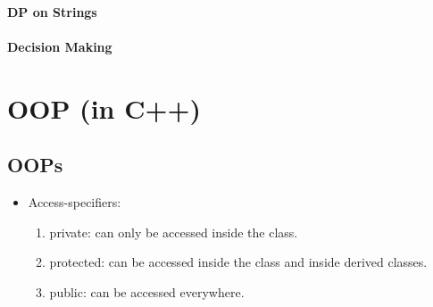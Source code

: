 \documentclass{report}
\begin{document}
\subsubsection{DP on Strings}
\subsubsection{Decision Making}
\chapter{OOP (in C++)}
\section{OOPs}
\begin{itemize}
    \item Access-specifiers:
    \begin{enumerate}
        \item private: can only be accessed inside the class.
        \item protected: can be accessed inside the class and inside derived classes.
        \item public: can be accessed everywhere.
    \end{enumerate}
\end{itemize}
\end{document}
